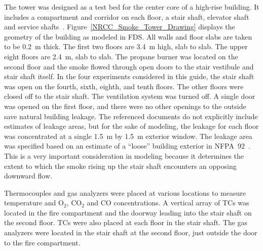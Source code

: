The tower was designed as a test bed for the center core of a high-rise building. It includes a compartment and corridor on each floor, a stair shaft, elevator shaft and service shafts~\cite{Achakji:1987}. Figure~\ref{NRCC_Smoke_Tower_Drawing} displays the geometry of the building as modeled in FDS. All walls and floor slabs are taken to be 0.2~m thick. The first two floors are 3.4~m high, slab to slab. The upper eight floors are 2.4~m, slab to slab. The propane burner was located on the second floor and the smoke flowed through open doors to the stair vestibule and stair shaft itself. In the four experiments considered in this guide, the stair shaft was open on the fourth, sixth, eighth, and tenth floors. The other floors were closed off to the stair shaft. The ventilation system was turned off. A single door was opened on the first floor, and there were no other openings to the outside save natural building leakage. The referenced documents do not explicitly include estimates of leakage areas, but for the sake of modeling, the leakage for each floor was concentrated at a single 1.5~m by 1.5~m exterior window. The leakage area was specified based on an estimate of a ``loose'' building exterior in NFPA~92~\cite{NFPA_92}. This is a very important consideration in modeling because it determines the extent to which the smoke rising up the stair shaft encounters an opposing downward flow.

Thermocouples and gas analyzers were placed at various locations to measure temperature and O$_2$, CO$_2$ and CO concentrations. A vertical array of TCs was located in the fire compartment and the doorway leading into the stair shaft on the second floor. TCs were also placed at each floor in the stair shaft. The gas analyzers were located in the stair shaft at the second floor, just outside the door to the fire compartment.



